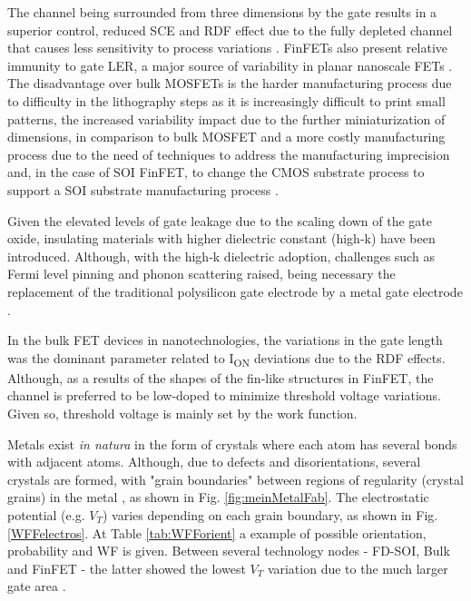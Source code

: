 \documentclass[diss,pgmicro,english]{iiufrgs}
\begin{document}
The channel being surrounded from three dimensions by the gate results in a superior control, reduced SCE and RDF effect due to the fully depleted channel that causes less sensitivity to process variations \cite{taur2013fundamentals}. FinFETs also present relative immunity to gate LER, a major source of variability in planar nanoscale FETs \cite{finfetchar1}. The disadvantage over bulk MOSFETs is the harder manufacturing process due to difficulty in the lithography steps as it is increasingly difficult to print small patterns, the increased variability impact due to the further miniaturization of dimensions, in comparison to bulk MOSFET and a more costly manufacturing process due to the need of techniques to address the manufacturing imprecision and, in the case of SOI FinFET, to change the CMOS substrate process to support a SOI substrate manufacturing process \cite{finfetchar1} \cite{finfetdis}.

Given the elevated levels of gate leakage due to the scaling down of the gate oxide, insulating materials with higher dielectric constant (high-k) have been introduced. Although, with the high-k dielectric adoption, challenges such as Fermi level pinning \cite{hobbs2004fermi} and phonon scattering \cite{gusev2006advanced} raised, being necessary the replacement of the traditional polysilicon gate electrode by a metal gate electrode \cite{gusev2001ultrathin, datta2003high}.

In the bulk FET devices in nanotechnologies, the variations in the gate length was the dominant parameter related to I\textsubscript{ON} deviations due to the RDF effects. Although, as a results of the shapes of the fin-like structures in FinFET, the channel is preferred to be low-doped to minimize threshold voltage variations. Given so, threshold voltage is mainly set by the work function.

Metals exist \textit{in natura} in the form of crystals where each atom has several bonds with adjacent atoms. Although, due to defects and disorientations, several crystals are formed, with "grain boundaries" between regions of regularity (crystal grains) in the metal \cite{dadgour2008statistical}, as shown in Fig. \ref{fig:meinMetalFab}. The electrostatic potential (e.g. $V_T$) varies depending on each grain boundary, as shown in Fig. \ref{WFFelectros}. At Table \ref{tab:WFForient} a example of possible orientation, probability and WF is given. Between several technology nodes - FD-SOI, Bulk and FinFET - the latter showed the lowest $V_T$ variation due to the much larger gate area \cite{dadgour2008statistical}.
\end{document}

